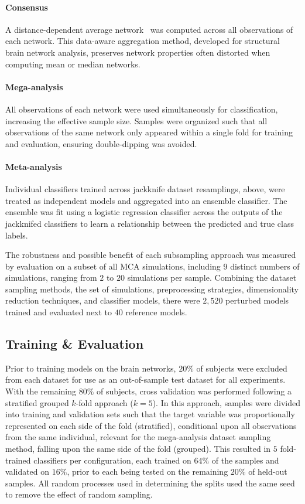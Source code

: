 \documentclass[10pt]{SelfArx} %
\begin{document}
\paragraph{Consensus} A distance-dependent average network~\cite{Betzel2018-eo} was computed across all observations
of each network. This data-aware aggregation method, developed for structural brain network analysis, preserves network
properties often distorted when computing mean or median networks.

\paragraph{Mega-analysis} All observations of each network were used simultaneously for classification, increasing
the effective sample size. Samples were organized such that all observations of the same network only appeared within a
single fold for training and evaluation, ensuring double-dipping was avoided.

\paragraph{Meta-analysis} Individual classifiers trained across jackknife dataset resamplings, above, were treated as
independent models and aggregated into an ensemble classifier. The ensemble was fit using a logistic regression
classifier across the outputs of the jackknifed classifiers to learn a relationship between the predicted and true
class labels.

The robustness and possible benefit of each subsampling approach was measured by evaluation on a subset of all MCA
simulations, including $9$ distinct numbers of simulations, ranging from $2$ to $20$ simulations per sample. Combining
the dataset sampling methods, the set of simulations, preprocessing strategies, dimensionality reduction techniques,
and classifier models, there were $2,520$ perturbed models trained and evaluated next to $40$ reference models.

\subsection*{Training \& Evaluation}

Prior to training models on the brain networks, $20\%$ of subjects were excluded from each dataset for use as an
out-of-sample test dataset for all experiments. With the remaining $80\%$ of subjects, cross validation was performed
following a stratified grouped $k$-fold approach ($k=5$). In this approach, samples were divided into training and
validation sets such that the target variable was proportionally represented on each side of the fold (stratified),
conditional upon all observations from the same individual, relevant for the mega-analysis dataset sampling method,
falling upon the same side of the fold (grouped). This resulted in $5$ fold-trained classifiers per configuration, each
trained on $64\%$ of the samples and validated on $16\%$, prior to each being tested on the remaining $20\%$ of
held-out samples. All random processes used in determining the splits used the same seed to remove the effect of random
sampling.
\end{document}
